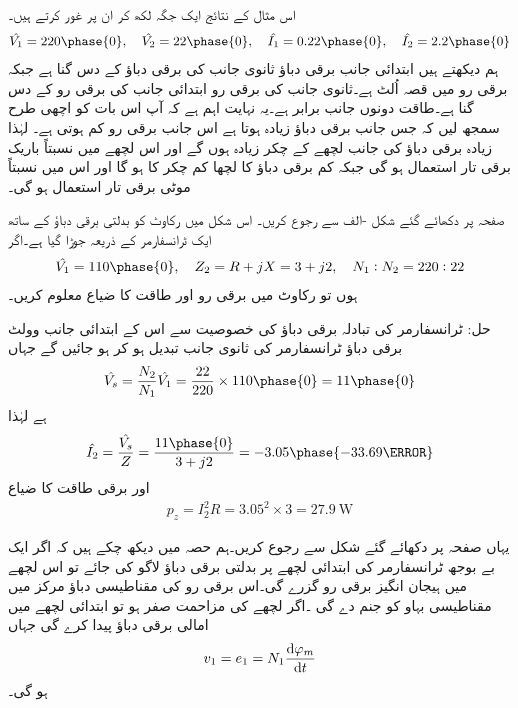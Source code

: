 اس مثال کے نتائج ایک جگہ لکھ کر ان پر غور کرتے ہیں۔
\begin{align*}
\hat{V_1}=220\phase{0}, \quad \hat{V_2}=22\phase{0}, \quad \hat{I_1}=0.22\phase{0}, \quad \hat{I_2}=2.2\phase{0}
\end{align*}
ہم دیکھتے ہیں ابتدائی جانب برقی دباؤ ثانوی جانب کی برقی دباؤ کے دس گنا ہے جبکہ برقی رو میں قصہ اُلٹ ہے۔ثانوی جانب کی برقی رو ابتدائی جانب کی برقی رو کے دس گنا ہے۔طاقت دونوں جانب برابر ہے۔یہ نہایت اہم ہے کہ آپ اس بات کو اچھی طرح سمجھ لیں کہ جس جانب برقی دباؤ زیادہ ہوتا ہے اس جانب برقی رو کم ہوتی ہے۔ لہٰذا زیادہ برقی دباؤ کی جانب لچھے کے چکر زیادہ ہوں گے اور اس لچھے میں نسبتاً باریک برقی تار استعمال ہو گی جبکہ کم برقی دباؤ کا لچھا کم چکر کا ہو گا اور اس میں نسبتاً موٹی برقی تار استعمال ہو گی۔ 

	صفحہ  پر دکھائے گئے شکل -الف سے رجوع کریں۔ اس شکل میں رکاوٹ  کو  بدلتی برقی دباؤ  کے ساتھ ایک ٹرانسفارمر کے ذریعہ جوڑا گیا ہے۔اگر
\begin{align*}
\hat{V_1}=110\phase{0},\quad Z_2=R+j X=3+j 2,\quad N_1:N_2=220:22 
\end{align*}
ہوں تو رکاوٹ میں برقی رو اور طاقت کا ضیاع معلوم کریں۔

حل:
	ٹرانسفارمر کی تبادلہ برقی دباؤ کی خصوصیت سے اس کے ابتدائی جانب  وولٹ برقی دباؤ ٹرانسفارمر کی ثانوی جانب تبدیل ہو کر   ہو جائیں گے جہاں
\begin{align*}
\hat{V_s}=\frac{N_2}{N_1} \hat{V_1}=\frac{22}{220} \times 110\phase{0}=11\phase{0}
\end{align*}
ہے لہٰذا
\begin{align*}
\hat{I_2}=\frac{\hat{V_s}}{Z}=\frac{11\phase{0}}{3+j 2}= -3.05\phase{-33.69\degree}
\end{align*}
اور برقی طاقت کا ضیاع 
\begin{align*}
p_z=I_2^2 R=3.05^2 \times 3=\SI{27.9}{\watt}
\end{align*}

یہاں صفحہ  پر دکھائے گئے  شکل   سے رجوع کریں۔ہم حصہ   میں دیکھ چکے ہیں کہ اگر ایک بے بوجھ ٹرانسفارمر کی ابتدائی لچھے پر بدلتی برقی دباؤ  لاگو کی جائے تو اس لچھے میں ہیجان انگیز برقی رو  گزرے گی۔اس برقی رو کی مقناطیسی دباؤ  مرکز میں مقناطیسی بہاو  کو جنم دے گی ۔اگر لچھے کی مزاحمت صفر ہو تو  ابتدائی لچھے میں  امالی برقی دباؤ پیدا کرے گی جہاں
\begin{align}\label{مساوات_ٹرانسفارمر_دباؤ_برابر_بہاو_تفرق}
v_1=e_1=N_1 \frac{\dif \varphi_m}{\dif t}
\end{align}
ہو گی۔

